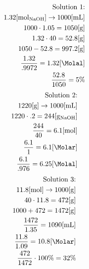 \documentclass[12pt]{article}
\begin{document}
\begin{enumerate}
    \begin{equation}
      \begin{split}
        \text{Solution 1:}\\
        1.32[\si{\mole}_{\ce{NaOH}}]\rightarrow1000[\si{\milli\liter}]\\
        1000\cdot1.05=1050[\si{\gram}]\\
        1.32\cdot40=52.8[\si{\gram}]\\
        1050-52.8=997.2[\si{\gram}]\\
        \frac{1.32}{.9972}=1.32[\si{\Molal}]\\
        \frac{52.8}{1050}=5\%\\
      \end{split}
      \label{5}
    \end{equation}
    \begin{equation}
      \begin{split}
        \text{Solution 2:}\\
        1220[\si{\gram}]\rightarrow1000[\si{\milli\liter}]\\
        1220\cdot.2=244[\si{\gram}_{\ce{NaOH}}]\\
        \frac{244}{40}=6.1[\si{\mole}]\\
        \frac{6.1}{1}=6.1[\si{\Molar}]\\
        \frac{6.1}{.976}=6.25[\si{\Molal}]\\
      \end{split}
      \label{6}
    \end{equation}
    \begin{equation}
      \begin{split}
        \text{Solution 3:}\\
        11.8[\si{\mole}]\rightarrow1000[\si{\gram}]\\
        40\cdot11.8=472[\si{\gram}]\\
        1000+472=1472[\si{\gram}]\\
        \frac{1472}{1.35}=1090[\si{\milli\liter}]\\
        \frac{11.8}{1.09}=10.8[\si{\Molar}]\\
        \frac{472}{1472}\cdot100\%=32\%\\
      \end{split}
      \label{7}
    \end{equation}
  
\end{enumerate}
\end{document}
